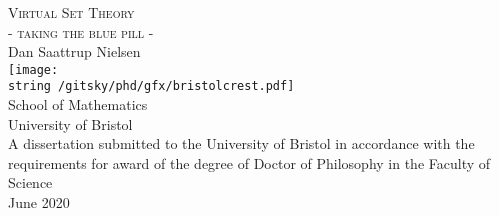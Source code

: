 \documentclass[../main]{subfiles}
\begin{document}
\begin{titlepage}
  \begin{center}
	  \vspace*{0.5cm}
    {\Huge\textsc{Virtual Set Theory}}\\[0.1cm]
    {\LARGE\textsc{- taking the blue pill -}}\\[0.6cm]
    {\LARGE Dan Saattrup Nielsen}\\[3.0cm]
    \texttt{[image: \\string~/gitsky/phd/gfx/bristolcrest.pdf]}\\
	  \vspace*{0.5cm}
    {\Large School of Mathematics}\\[0.2cm]
    {\Large\sc University of Bristol}\\[0.6cm]
	  \vspace*{\fill}
    {\large A dissertation submitted to the University of Bristol in accordance with the requirements for award of the degree of Doctor of Philosophy in the Faculty of Science}\\[0.5cm]
    {\large\sc June 2020}
  \end{center}
\end{titlepage}

\noindent
\pagestyle{fancy}
\fancyhead[L]{\nouppercase\leftmark}
\fancyhead[R]{\nouppercase\rightmark}
\setlength\headsep{35pt}

\thispagestyle{empty}
\end{document}
